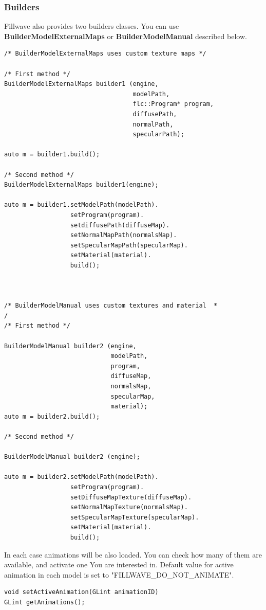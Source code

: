 \documentclass{article}
\begin{document}
\subsubsection{Builders}\label{sec:builderCreation}
\indent \indent Fillwave also provides two builders classes. You can use \textbf{BuilderModelExternalMaps} or \textbf{BuilderModelManual} described below.
\begin{lstlisting}
/* BuilderModelExternalMaps uses custom texture maps */

/* First method */
BuilderModelExternalMaps builder1 (engine,
                                   modelPath,
                                   flc::Program* program,
                                   diffusePath,
                                   normalPath,
                                   specularPath);

auto m = builder1.build();

/* Second method */
BuilderModelExternalMaps builder1(engine);

auto m = builder1.setModelPath(modelPath).
                  setProgram(program).
                  setdiffusePath(diffuseMap).
                  setNormalMapPath(normalsMap).
                  setSpecularMapPath(specularMap).
                  setMaterial(material).
                  build();



/* BuilderModelManual uses custom textures and material  *
/
/* First method */

BuilderModelManual builder2 (engine,
                             modelPath,
                             program,
                             diffuseMap,
                             normalsMap,
                             specularMap,
                             material);
auto m = builder2.build();

/* Second method */

BuilderModelManual builder2 (engine);

auto m = builder2.setModelPath(modelPath).
                  setProgram(program).
                  setDiffuseMapTexture(diffuseMap).
                  setNormalMapTexture(normalsMap).
                  setSpecularMapTexture(specularMap).
                  setMaterial(material).
                  build();

\end{lstlisting}

\indent In each case animations will be also loaded. You can check how many of them are available, and activate one You are interested in. Default value for active animation in each model is set to "FILLWAVE\_DO\_NOT\_ANIMATE".
\begin{lstlisting}
void setActiveAnimation(GLint animationID)
GLint getAnimations();
\end{lstlisting}
\end{document}
